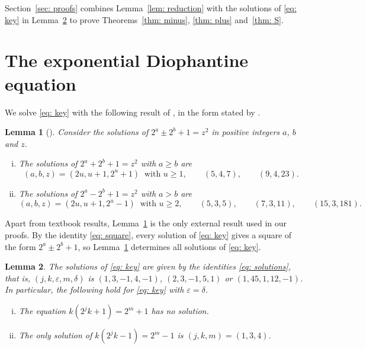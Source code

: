 \documentclass{article}
\newtheorem{lemma}{Lemma}
\newcommand{\Ge}{\geqslant}
\begin{document}
Section~\ref{sec: proofs} combines Lemma~\ref{lem: reduction} with the solutions of \eqref{eq: key} in Lemma~\ref{lem: key} to prove Theorems~\ref{thm: minus}, \ref{thm: plus} and~\ref{thm: S}.

\section{The exponential Diophantine equation}
\label{sec: equation}

We solve \eqref{eq: key} with the following result of \citet{szalay2002equations}, in the form stated by \citet[Theorems~1.1 and~1.2]{scott2006elementary}.

\begin{lemma}[\citet{szalay2002equations}]
\label{lem: szalay}
    Consider the solutions of $2^a \pm 2^b + 1 = z^2$ in positive integers $a$, $b$ and $z$.
    \begin{enumerate}[(i)]
        \setlength{\itemsep}{0pt}
        \item The solutions of $2^a + 2^b + 1 = z^2$ with $a \Ge b$ are
        \begin{equation*}
            (a, b, z) = (2u, u + 1, 2^u + 1) \ \text{ with } u \Ge 1 , \qquad (5, 4, 7) , \qquad (9, 4, 23) .
        \end{equation*}
        \item The solutions of $2^a - 2^b + 1 = z^2$ with $a > b$ are
        \begin{equation*}
            (a, b, z) = (2u, u + 1, 2^u - 1) \ \text{ with } u \Ge 2 , \qquad (5, 3, 5) , \qquad (7, 3, 11) , \qquad (15, 3, 181) .
        \end{equation*}
    \end{enumerate}
\end{lemma}

Apart from textbook results, Lemma~\ref{lem: szalay} is the only external result used in our proofs. By the identity \eqref{eq: square}, every solution of \eqref{eq: key} gives a square of the form $2^a \pm 2^b + 1$, so Lemma~\ref{lem: szalay} determines all solutions of \eqref{eq: key}.

\begin{lemma}
\label{lem: key}
    The solutions of \eqref{eq: key} are given by the identities \eqref{eq: solutions}, that is, $(j, k, \varepsilon, m, \delta)$ is $(1, 3, -1, 4, -1)$, $(2, 3, -1, 5, 1)$ or $(1, 45, 1, 12, -1)$. In particular, the following hold for \eqref{eq: key} with $\varepsilon = \delta$.
    \begin{enumerate}[(i)]
        \setlength{\itemsep}{0pt}
        \item The equation $k (2^j k + 1) = 2^m + 1$ has no solution.
        \item The only solution of $k (2^j k - 1) = 2^m - 1$ is $(j, k, m) = (1, 3, 4)$.
    \end{enumerate}
\end{lemma}
\end{document}
